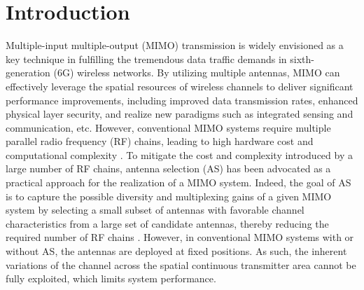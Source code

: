 \documentclass[12pt, draftclsnofoot, onecolumn]{IEEEtran}
\begin{document}
\section{Introduction}
Multiple-input multiple-output (MIMO) transmission is widely envisioned as a key technique in fulfilling the tremendous data traffic demands in sixth-generation (6G) wireless networks. By utilizing multiple antennas, MIMO can effectively leverage the spatial resources of wireless channels to deliver significant performance improvements, including improved data transmission rates\cite{mietzner2009multiple}, enhanced physical layer security\cite{tsai2014power}, and realize new paradigms such as integrated sensing and communication\cite{xu2022robust}, etc. However, conventional MIMO systems require multiple parallel radio frequency (RF) chains, leading to high hardware cost and computational complexity \cite{mietzner2009multiple}. %
To mitigate the cost and complexity introduced by a large number of RF chains, antenna selection (AS) has been advocated as a practical approach for the realization of a MIMO system. Indeed, the goal of AS is to capture the possible diversity and multiplexing gains of a given MIMO system by selecting a small subset of antennas with favorable channel characteristics from a large set of candidate antennas, thereby reducing the required number of RF chains \cite{sanayei2004antenna}. However, %
in conventional MIMO systems with or without AS, the antennas are deployed at fixed positions. As such, the inherent variations of the channel across the spatial continuous transmitter area cannot be fully exploited, which limits system performance.%
\end{document}
